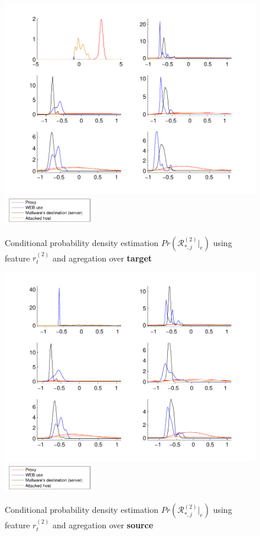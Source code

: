 \documentclass[a4paper,journal]{IEEEtran}
\begin{document}
\begin{figure}[h!]%
  \centering
  \includegraphics[width=140mm]{dens_dst_logp}
      \includegraphics[width=40mm]{legend}
  \caption{Conditional probability density estimation $Pr ( \mathcal{R}^{(2)}_{*,j}|_e ) $ using feature $r_t^{(2)}$ and agregation over \textbf{target}}
  \label{fig:dens_dst_logp}
\end{figure}
\begin{figure}[h!]%
  \centering
  \includegraphics[width=140mm]{dens_src_logp}
  \includegraphics[width=40mm]{legend}
  \caption{Conditional probability density estimation $Pr ( \mathcal{R}^{(2)}_{*,j}|_e ) $ using feature $r_t^{(2)}$ and agregation over \textbf{source}}
  \label{fig:dens_src_logp}
\end{figure}
\end{document}
